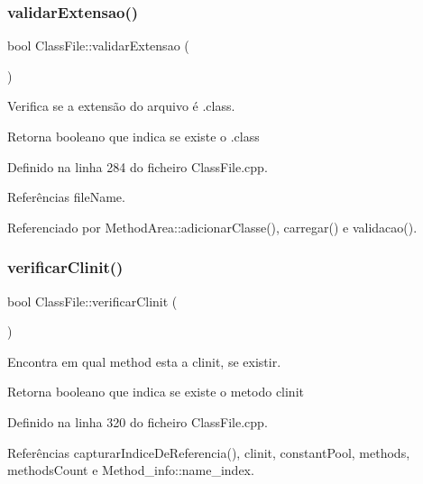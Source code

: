 \subsubsection{\texorpdfstring{validar\+Extensao()}{validarExtensao()}}
{\footnotesize\ttfamily bool Class\+File\+::validar\+Extensao (\begin{DoxyParamCaption}{ }\end{DoxyParamCaption})}



Verifica se a extensão do arquivo é .class. 

\begin{DoxyReturn}{Retorna}
booleano que indica se existe o .class 
\end{DoxyReturn}


Definido na linha 284 do ficheiro Class\+File.\+cpp.



Referências file\+Name.



Referenciado por Method\+Area\+::adicionar\+Classe(), carregar() e validacao().

\mbox{\label{classClassFile_ab0394185a299f35a9b5be68143385e84}} 
\subsubsection{\texorpdfstring{verificar\+Clinit()}{verificarClinit()}}
{\footnotesize\ttfamily bool Class\+File\+::verificar\+Clinit (\begin{DoxyParamCaption}{ }\end{DoxyParamCaption})\hspace{0.3cm}{\ttfamily [private]}}



Encontra em qual method esta a clinit, se existir. 

\begin{DoxyReturn}{Retorna}
booleano que indica se existe o metodo clinit 
\end{DoxyReturn}


Definido na linha 320 do ficheiro Class\+File.\+cpp.



Referências capturar\+Indice\+De\+Referencia(), clinit, constant\+Pool, methods, methods\+Count e Method\+\_\+info\+::name\+\_\+index.



